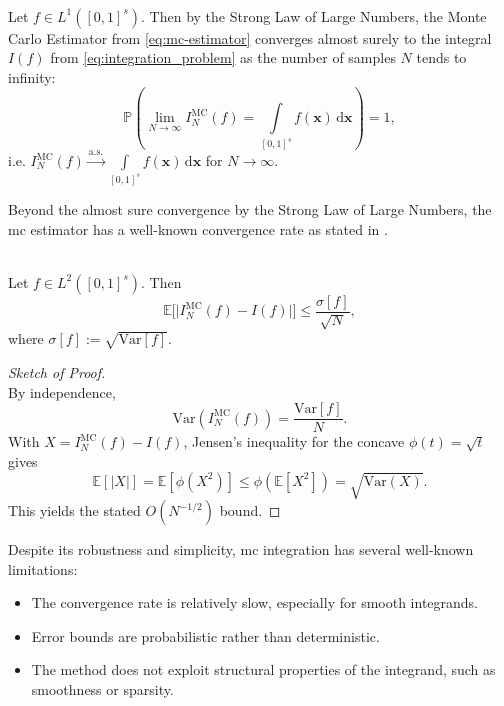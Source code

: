 \begin{remark} \ \\
Let $f \in L^1([0,1]^s)$. Then by the Strong Law of Large Numbers, the Monte
Carlo Estimator from \eqref{eq:mc-estimator} converges almost surely to the
integral $I(f)$ from \eqref{eq:integration_problem} as the number of samples $N$
tends to infinity:
\begin{equation}
    \mathbb{P}\!\left( \lim_{N \to \infty} I_N^{\mathrm{MC}}(f) = 
    \int\limits_{[0,1]^s} f(\mathbf{x})\, \mathrm{d}\mathbf{x} \right) = 1,
\end{equation}
i.e. $I_N^{\mathrm{MC}}(f) \xrightarrow{\mathrm{a.s.}} \int\limits_{[0,1]^s}
f(\mathbf{x})\, \mathrm{d}\mathbf{x}$ for $N\to \infty$.
\end{remark}

Beyond the almost sure convergence by the Strong Law of Large Numbers, the
\ac{mc} estimator has a well-known convergence rate as stated in \cite[Section
1.2]{leobacher2014introduction}.

\begin{theorem} \ \\
\label{thm:mc-convergence-rate}
Let $f \in L^2([0,1]^s)$. Then
\begin{equation}
    \mathbb{E}\bigg[ \big| I_N^{\mathrm{MC}}(f) - I(f) \big| \bigg] \leq \frac{\sigma[f]}{\sqrt{N}},
\end{equation}
where $\sigma[f] := \sqrt{\mathrm{Var}[f]}$.
\end{theorem}

\begin{proof}[Sketch of Proof] \ \\
By independence, 
\begin{equation*}
\mathrm{Var}\!\left(I_N^{\mathrm{MC}}(f)\right) = \frac{\mathrm{Var}[f]}{N}.
\end{equation*}
With $X = I_N^{\mathrm{MC}}(f)-I(f)$, Jensen's inequality for the concave
$\phi(t)=\sqrt{t}$ gives
\begin{equation*}
\mathbb{E}[|X|] = \mathbb{E}[\phi(X^2)]
\le \phi(\mathbb{E}[X^2])
= \sqrt{\mathrm{Var}(X)}.
\end{equation*}
This yields the stated $O(N^{-1/2})$ bound.
\end{proof}

Despite its robustness and simplicity, \ac{mc} integration has several well-known
limitations:
\begin{itemize}
    \item The convergence rate is relatively slow, especially for smooth
    integrands.
    \item Error bounds are probabilistic rather than deterministic.
    \item The method does not exploit structural properties of the integrand,
    such as smoothness or sparsity.
\end{itemize}


